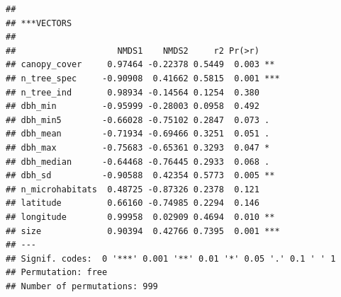 \documentclass[
]{article}
\newenvironment{Shaded}{\begin{snugshade}}{\end{snugshade}}
\newcommand{\AttributeTok}[1]{\textcolor[rgb]{0.77,0.63,0.00}{#1}}
\newcommand{\CommentTok}[1]{\textcolor[rgb]{0.56,0.35,0.01}{\textit{#1}}}
\newcommand{\ConstantTok}[1]{\textcolor[rgb]{0.00,0.00,0.00}{#1}}
\newcommand{\DecValTok}[1]{\textcolor[rgb]{0.00,0.00,0.81}{#1}}
\newcommand{\FloatTok}[1]{\textcolor[rgb]{0.00,0.00,0.81}{#1}}
\newcommand{\FunctionTok}[1]{\textcolor[rgb]{0.00,0.00,0.00}{#1}}
\newcommand{\NormalTok}[1]{#1}
\newcommand{\OtherTok}[1]{\textcolor[rgb]{0.56,0.35,0.01}{#1}}
\newcommand{\SpecialCharTok}[1]{\textcolor[rgb]{0.00,0.00,0.00}{#1}}
\newcommand{\StringTok}[1]{\textcolor[rgb]{0.31,0.60,0.02}{#1}}
\begin{document}
\begin{Shaded}
\end{Shaded}

\begin{verbatim}
## 
## ***VECTORS
## 
##                    NMDS1    NMDS2     r2 Pr(>r)    
## canopy_cover     0.97464 -0.22378 0.5449  0.003 ** 
## n_tree_spec     -0.90908  0.41662 0.5815  0.001 ***
## n_tree_ind       0.98934 -0.14564 0.1254  0.380    
## dbh_min         -0.95999 -0.28003 0.0958  0.492    
## dbh_min5        -0.66028 -0.75102 0.2847  0.073 .  
## dbh_mean        -0.71934 -0.69466 0.3251  0.051 .  
## dbh_max         -0.75683 -0.65361 0.3293  0.047 *  
## dbh_median      -0.64468 -0.76445 0.2933  0.068 .  
## dbh_sd          -0.90588  0.42354 0.5773  0.005 ** 
## n_microhabitats  0.48725 -0.87326 0.2378  0.121    
## latitude         0.66160 -0.74985 0.2294  0.146    
## longitude        0.99958  0.02909 0.4694  0.010 ** 
## size             0.90394  0.42766 0.7395  0.001 ***
## ---
## Signif. codes:  0 '***' 0.001 '**' 0.01 '*' 0.05 '.' 0.1 ' ' 1
## Permutation: free
## Number of permutations: 999
\end{verbatim}
\end{document}

